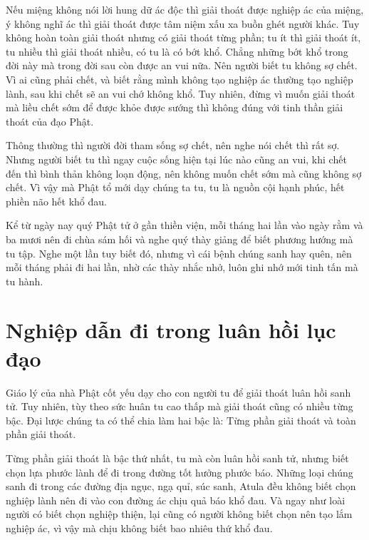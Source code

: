 \documentclass[
  12pt,
  oneside]{book}
\begin{document}
Nếu miệng không nói lời hung dữ ác độc thì giải thoát được nghiệp ác của miệng, ý không nghĩ ác thì giải thoát được tâm niệm xấu xa buồn ghét người khác. Tuy không hoàn toàn giải thoát nhưng có giải thoát từng phần; tu ít thì giải thoát ít, tu nhiều thì giải thoát nhiều, có tu là có bớt khổ. Chẳng những bớt khổ trong đời này mà trong đời sau còn được an vui nữa. Nên người biết tu không sợ chết. Vì ai cũng phải chết, và biết rằng mình không tạo nghiệp ác thường tạo nghiệp lành, sau khi chết sẽ an vui chớ không khổ. Tuy nhiên, đừng vì muốn giải thoát mà liều chết sớm để được khỏe được sướng thì không đúng với tinh thần giải thoát của đạo Phật.

Thông thường thì người đời tham sống sợ chết, nên nghe nói chết thì rất sợ. Nhưng người biết tu thì ngay cuộc sống hiện tại lúc nào cũng an vui, khi chết đến thì bình thản không loạn động, nên không muốn chết sớm mà cũng không sợ chết. Vì vậy mà Phật tổ mới dạy chúng ta tu, tu là nguồn cội hạnh phúc, hết phiền não hết khổ đau.

Kể từ ngày nay quý Phật tử ở gần thiền viện, mỗi tháng hai lần vào ngày rằm và ba mươi nên đi chùa sám hối và nghe quý thày giảng để biết phương hướng mà tu tập. Nghe một lần tuy biết đó, nhưng vì cái bệnh chúng sanh hay quên, nên mỗi tháng phải đi hai lần, nhờ các thày nhắc nhở, luôn ghi nhớ mới tinh tấn mà tu hành.

\hypertarget{nghiep-dan-di-trong-luan-hoi-luc-dao}{%
\chapter*{Nghiệp dẫn đi trong luân hồi lục đạo}\label{nghiep-dan-di-trong-luan-hoi-luc-dao}}

Giáo lý của nhà Phật cốt yếu dạy cho con người tu để giải thoát luân hồi sanh tử. Tuy nhiên, tùy theo sức huân tu cao thấp mà giải thoát cũng có nhiều từng bậc. Đại lược chúng ta có thể chia làm hai bậc là: Từng phần giải thoát và toàn phần giải thoát.

Từng phần giải thoát là bậc thứ nhất, tu mà còn luân hồi sanh tử, nhưng biết chọn lựa phước lành để đi trong đường tốt hưởng phước báo. Những loại chúng sanh đi trong các đường địa ngục, ngạ quỉ, súc sanh, Atula đều không biết chọn nghiệp lành nên đi vào con đường ác chịu quả báo khổ đau. Và ngay như loài người có biết chọn nghiệp thiện, lại cũng có người không biết chọn nên tạo lắm nghiệp ác, vì vậy mà chịu không biết bao nhiêu thứ khổ đau.
\end{document}
